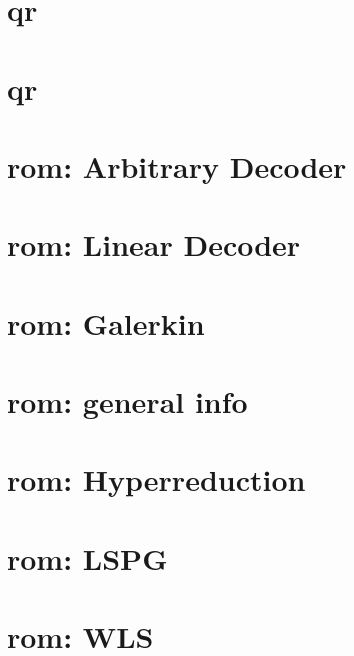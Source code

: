 \let\mypdfximage\pdfximage\def\pdfximage{\immediate\mypdfximage}\documentclass[twoside]{book}
\newcommand{\+}{\discretionary{\mbox{\scriptsize$\hookleftarrow$}}{}{}}
\begin{document}
\chapter{qr}
\label{md_pages_components_qr_copy}

\chapter{qr}
\label{md_pages_components_qr}

\chapter{rom\+: Arbitrary Decoder}
\label{md_pages_components_rom_decoder}

\chapter{rom\+: Linear Decoder}
\label{md_pages_components_rom_decoder_linear}

\chapter{rom\+: Galerkin}
\label{md_pages_components_rom_galerkin}

\chapter{rom\+: general info}
\label{md_pages_components_rom_general}

\chapter{rom\+: Hyperreduction}
\label{md_pages_components_rom_hyperreduction}

\chapter{rom\+: LSPG}
\label{md_pages_components_rom_lspg}

\chapter{rom\+: WLS}
\label{md_pages_components_rom_wls}

\end{document}
